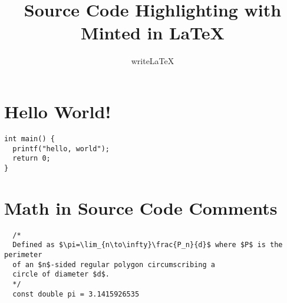 \documentclass{article}
\begin{document}
\title{Source Code Highlighting with Minted in LaTeX}
\author{writeLaTeX}
\maketitle

\section{Hello World!}
\begin{verbatim}
int main() {
  printf("hello, world");
  return 0;
}
\end{verbatim}

\section{Math in Source Code Comments}
\begin{verbatim}
  /*
  Defined as $\pi=\lim_{n\to\infty}\frac{P_n}{d}$ where $P$ is the perimeter
  of an $n$-sided regular polygon circumscribing a
  circle of diameter $d$.
  */
  const double pi = 3.1415926535
\end{verbatim}
\end{document}

